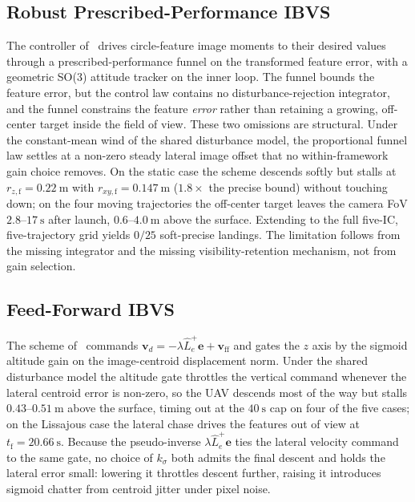 \documentclass{IEEEtaes}
\begin{document}
\subsection{Robust Prescribed-Performance IBVS \cite{lin2023}}
The controller of~\cite{lin2023} drives circle-feature image moments to their desired values through a prescribed-performance funnel on the transformed feature error, with a geometric SO(3) attitude tracker on the inner loop. The funnel bounds the feature error, but the control law contains no disturbance-rejection integrator, and the funnel constrains the feature \emph{error} rather than retaining a growing, off-center target inside the field of view. These two omissions are structural. Under the constant-mean wind of the shared disturbance model, the proportional funnel law settles at a non-zero steady lateral image offset that no within-framework gain choice removes. On the static case the scheme descends softly but stalls at $r_{z,\text{f}}=0.22~\text{m}$ with $r_{xy,\text{f}}=0.147~\text{m}$ ($1.8\times$ the precise bound) without touching down; on the four moving trajectories the off-center target leaves the camera FoV $2.8$--$17~\text{s}$ after launch, $0.6$--$4.0~\text{m}$ above the surface. Extending to the full five-IC, five-trajectory grid yields $0/25$ soft-precise landings. The limitation follows from the missing integrator and the missing visibility-retention mechanism, not from gain selection.

\subsection{Feed-Forward IBVS \cite{cho2022}}
The scheme of~\cite{cho2022} commands $\boldsymbol{v}_d=-\lambda\hat{L}_e^+\boldsymbol{e}+\boldsymbol{v}_{\text{ff}}$ and gates the $z$ axis by the sigmoid altitude gain on the image-centroid displacement norm. Under the shared disturbance model the altitude gate throttles the vertical command whenever the lateral centroid error is non-zero, so the UAV descends most of the way but stalls $0.43$--$0.51~\text{m}$ above the surface, timing out at the $40~\text{s}$ cap on four of the five cases; on the Lissajous case the lateral chase drives the features out of view at $t_\text{f}=20.66~\text{s}$. Because the pseudo-inverse $\lambda\hat{L}_e^+\boldsymbol{e}$ ties the lateral velocity command to the same gate, no choice of $k_\sigma$ both admits the final descent and holds the lateral error small: lowering it throttles descent further, raising it introduces sigmoid chatter from centroid jitter under pixel noise.
\end{document}
